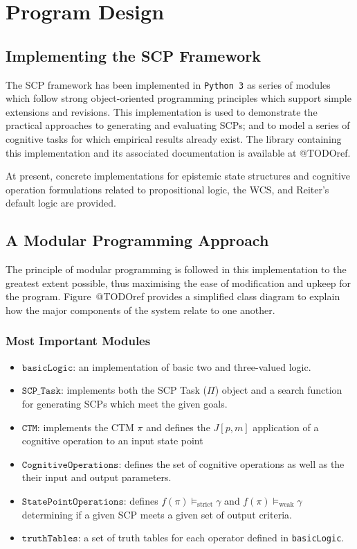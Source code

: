 \chapter{Program Design} \label{chp:program}
\section{Implementing the SCP Framework}
The SCP framework has been implemented in \texttt{Python 3} as series of modules which follow strong object-oriented programming principles which support simple extensions and revisions. This implementation is used to demonstrate the practical approaches to generating and evaluating SCPs; and to model a series of cognitive tasks for which empirical results already exist. The library containing this implementation and its associated documentation is available at @TODOref.

At present, concrete implementations for epistemic state structures and cognitive operation formulations related to propositional logic, the WCS, and Reiter's default logic are provided.

\section{A Modular Programming Approach}
The principle of modular programming is followed in this implementation to the greatest extent possible, thus maximising the ease of modification and upkeep for the program. Figure~@TODOref provides a simplified class diagram to explain how the major components of the system relate to one another.

\subsection{Most Important Modules}

\begin{itemize}
\item $\texttt{basicLogic}$: an implementation of basic two and three-valued logic.
\item $\texttt{SCP\_Task}$: implements both the SCP Task ($\Pi$) object and a search function for generating SCPs which meet the given goals.
\item $\texttt{CTM}$: implements the CTM $\pi$ and defines the $J[p,m]$ application of a cognitive operation to an input state point
\item $\texttt{CognitiveOperations}$: defines the set of cognitive operations as well as the their input and output parameters.
\item $\texttt{StatePointOperations}$: defines $f(\pi) \models_\text{strict} \gamma$ and $f(\pi) \models_\text{weak} \gamma$ determining if a given SCP meets a given set of output criteria.
\item $\texttt{truthTables}$: a set of truth tables for each operator defined in \texttt{basicLogic}.
\end{itemize}

